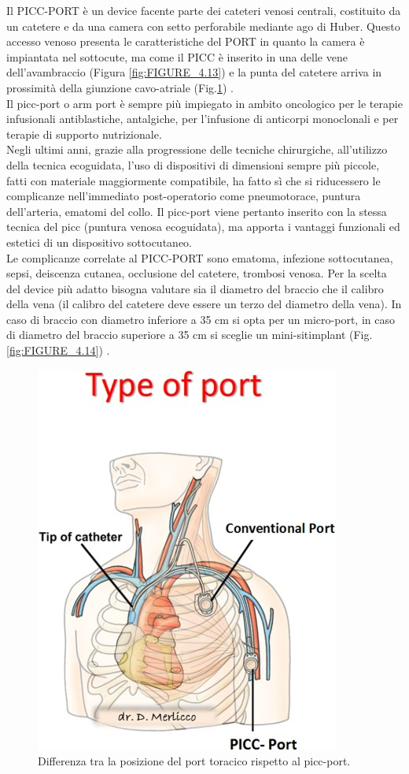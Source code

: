 Il PICC-PORT è un device facente parte dei cateteri venosi centrali, costituito da un catetere e da una camera con 
setto perforabile mediante ago di Huber. Questo accesso venoso presenta le caratteristiche del PORT in quanto la 
camera è impiantata nel sottocute, ma come il PICC è inserito in una delle vene dell’avambraccio (Figura \ref{fig:FIGURE_4.13})
e la punta del catetere arriva in prossimità della giunzione cavo-atriale (Fig.\ref{fig:FIGURE_4.12}) \cite{CRO}.\\
Il picc-port o arm port è sempre più impiegato in ambito oncologico per le terapie infusionali antiblastiche, 
antalgiche, per l’infusione di anticorpi monoclonali e per terapie di supporto nutrizionale\cite{GAVECELTPICCPORT}.\\
Negli ultimi anni, grazie alla progressione delle tecniche chirurgiche, all’utilizzo della tecnica ecoguidata, 
l’uso di dispositivi di dimensioni sempre più piccole, fatti con materiale maggiormente compatibile, ha fatto sì che 
si riducessero le complicanze nell’immediato post-operatorio come pneumotorace, puntura dell’arteria, 
ematomi del collo. Il picc-port viene pertanto inserito con la stessa tecnica del picc (puntura venosa ecoguidata), 
ma apporta i vantaggi funzionali ed estetici di un dispositivo sottocutaneo\cite{MERLICCO}.\\
Le complicanze correlate al PICC-PORT sono ematoma, infezione sottocutanea, sepsi, deiscenza cutanea, occlusione del 
catetere, trombosi venosa. 
Per la scelta del device più adatto bisogna valutare sia il diametro del braccio che il calibro della vena 
(il calibro del catetere deve essere un terzo del diametro della vena). In caso di braccio con diametro inferiore a 
35 cm si opta per un micro-port, in caso di diametro del braccio superiore a 35 cm si sceglie un 
mini-sitimplant (Fig.\ref{fig:FIGURE_4.14}) \cite{GAVECELTPICCPORT}.\\

\begin{figure}[H]
    \begin{center}
    \includegraphics[width=0.4\columnwidth]{img/picc-port.jpg}
    \end{center}
    \caption{Differenza tra la posizione del port toracico rispetto al picc-port.
    \cite{img48}}
    \label{fig:FIGURE_4.12}
\end{figure}

